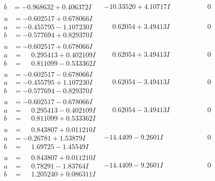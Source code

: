 \documentclass[1p]{elsarticle_modified}
\theoremstyle{definition}
\begin{document}
$$\begin{array}{c|c|c}
\begin{aligned}
b &= -0.968632 + 0.406372 I\end{aligned}
 & -10.33520 + 4.10717 I & \phantom{-0.000000 } 0 \\ \hline\begin{aligned}
u &= -0.602517 + 0.678066 I \\
a &= -0.455795 - 1.107230 I \\
b &= -0.577694 + 0.829370 I\end{aligned}
 & \phantom{-}0.62054 + 3.49413 I & \phantom{-0.000000 } 0 \\ \hline\begin{aligned}
u &= -0.602517 + 0.678066 I \\
a &= \phantom{-}0.295413 + 0.402109 I \\
b &= \phantom{-}0.811099 - 0.533362 I\end{aligned}
 & \phantom{-}0.62054 + 3.49413 I & \phantom{-0.000000 } 0 \\ \hline\begin{aligned}
u &= -0.602517 - 0.678066 I \\
a &= -0.455795 + 1.107230 I \\
b &= -0.577694 - 0.829370 I\end{aligned}
 & \phantom{-}0.62054 - 3.49413 I & \phantom{-0.000000 } 0 \\ \hline\begin{aligned}
u &= -0.602517 - 0.678066 I \\
a &= \phantom{-}0.295413 - 0.402109 I \\
b &= \phantom{-}0.811099 + 0.533362 I\end{aligned}
 & \phantom{-}0.62054 - 3.49413 I & \phantom{-0.000000 } 0 \\ \hline\begin{aligned}
u &= \phantom{-}0.843807 + 0.011210 I \\
a &= -0.26781 + 1.53879 I \\
b &= \phantom{-}1.69725 - 1.45549 I\end{aligned}
 & -14.4409 - 9.2601 I & \phantom{-0.000000 } 0 \\ \hline\begin{aligned}
u &= \phantom{-}0.843807 + 0.011210 I \\
a &= \phantom{-}0.78291 - 1.83764 I \\
b &= \phantom{-}1.205240 + 0.086311 I\end{aligned}
 & -14.4409 - 9.2601 I & \phantom{-0.000000 } 0 \\ \hline\begin{aligned}

\end{aligned}
\end{array}$$
\end{document}
